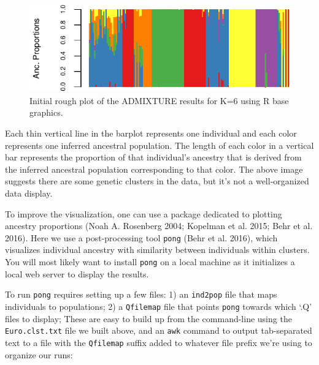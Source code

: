 \documentclass[smallextended]{svmult}       %
\newenvironment{Shaded}{\begin{snugshade}}{\end{snugshade}}
\newcommand{\StringTok}[1]{\textcolor[rgb]{0.31,0.60,0.02}{#1}}
\newcommand{\FunctionTok}[1]{\textcolor[rgb]{0.00,0.00,0.00}{#1}}
\newcommand{\VariableTok}[1]{\textcolor[rgb]{0.00,0.00,0.00}{#1}}
\newcommand{\OperatorTok}[1]{\textcolor[rgb]{0.81,0.36,0.00}{\textbf{#1}}}
\newcommand{\NormalTok}[1]{#1}
\begin{document}
\begin{figure}
\centering
\includegraphics{plot/unnamed-chunk-4-1.pdf}
\caption{Initial rough plot of the ADMIXTURE results for K=6 using R
base graphics.}
\end{figure}

Each thin vertical line in the barplot represents one individual and
each color represents one inferred ancestral population. The length of
each color in a vertical bar represents the proportion of that
individual's ancestry that is derived from the inferred ancestral
population corresponding to that color. The above image suggests there
are some genetic clusters in the data, but it's not a well-organized
data display.

To improve the visualization, one can use a package dedicated to
plotting ancestry proportions (Noah A. Rosenberg 2004; Kopelman et al.
2015; Behr et al. 2016). Here we use a post-processing tool
\texttt{pong} (Behr et al. 2016), which visualizes individual ancestry
with similarity between individuals within clusters. You will most
likely want to install \texttt{pong} on a local machine as it
initializes a local web server to display the results.

To run \texttt{pong} requires setting up a few files: 1) an
\texttt{ind2pop} file that maps individuals to populations; 2) a
\texttt{Qfilemap} file that points \texttt{pong} towards which `.Q'
files to display; These are easy to build up from the command-line using
the \texttt{Euro.clst.txt} file we built above, and an \texttt{awk}
command to output tab-separated text to a file with the
\texttt{Qfilemap} suffix added to whatever file prefix we're using to
organize our runs:

\begin{Shaded}
\end{Shaded}
\end{document}
